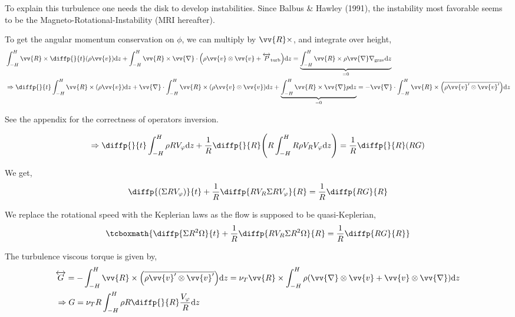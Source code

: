 \documentclass[10pt,a4paper,english]{article}
\let\originalleft\left
\let\originalright\right
\renewcommand{\left}{\mathopen{}\mathclose\bgroup\originalleft}
\renewcommand{\right}{\aftergroup\egroup\originalright}
\begin{document}

To explain this turbulence one needs the disk to develop instabilities. Since
Balbus \& Hawley (1991), the instability most favorable seems to be the
Magneto-Rotational-Instability (MRI hereafter).


To get the angular momentum conservation on $\phi$, we can multiply by $\vv{R} \times$, and integrate over height,
\begin{align*}
    &\int_{-H}^H \vv{R} \times \diffp{}{t}(\rho \vv{v}) \d{z} +
    \int_{-H}^H \vv{R} \times \vv{\nabla} \cdot \left(\rho \vv{v} \otimes \vv{v} + \tens{P}_\mathrm{turb}\right) \d{z} =
    \underbrace{\int_{-H}^H \vv{R} \times \rho \vv{\nabla} \nabla_\mathrm{grav} \d{z}}_{= 0} \\
    &\Rightarrow \diffp{}{t} \int_{-H}^H \vv{R} \times (\rho \vv{v}) \d{z} +
    \vv{\nabla} \cdot \int_{-H}^H \vv{R} \times \left( \rho \vv{v} \otimes \vv{v} \right) \d{z} +
    \underbrace{\int_{-H}^H \vv{R} \times \vv{\nabla} p \d{z}}_{= 0} =
    - \vv{\nabla} \cdot \int_{-H}^H \vv{R} \times \left(\overline{\rho \vv{v}' \otimes \vv{v}'}\right) \d{z}
\end{align*}

See the appendix for the correctness of operators inversion.


\begin{equation*}
    \Rightarrow \diffp{}{t} \int_{-H}^H \rho R V_\varphi \d{z} + \frac{1}{R} \diffp{}{R} \left( R \int_{-H}^H R \rho V_R V_\varphi \d{z} \right) =
    \frac{1}{R} \diffp{}{R} \left( R G \right)
\end{equation*}

We get,
\begin{equation*}
    \diffp{\left(\Sigma R V_\varphi\right)}{t} + \frac{1}{R} \diffp{R V_R \Sigma R V_\varphi}{R} = \frac{1}{R} \diffp{RG}{R}
\end{equation*}

We replace the rotational speed with the Keplerian laws as the flow is supposed to be quasi-Keplerian,
\begin{equation}
    \label{eq:alpha_moment}
    \tcboxmath{
        \diffp{\Sigma R^2 \Omega}{t} + \frac{1}{R} \diffp{R V_R \Sigma R^2 \Omega}{R} = \frac{1}{R} \diffp{RG}{R}
    }
\end{equation}

The turbulence viscous torque is given by,
\begin{align*}
    & \overleftrightarrow{G} = - \int_{-H}^H \vv{R} \times \left( \overline{\rho \vv{v}' \otimes \vv{v}'} \right) \d{z} =
    \nu_T \vv{R} \times \int_{-H}^H \rho \left(\vv{\nabla} \otimes \vv{v} + \vv{v} \otimes \vv{\nabla} \right) \d{z} \\
    & \Rightarrow G = \nu_T R \int_{-H}^{H} \rho R \diffp{}{R} \frac{V_\varphi}{R} \d{z}
\end{align*}
\end{document}
